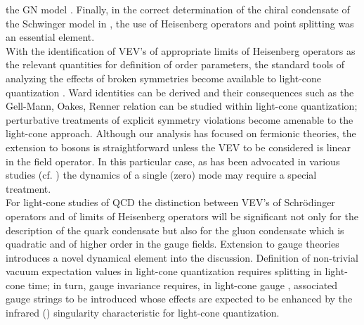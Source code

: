 \documentclass[a4paper,12pt]{article}
\begin{document}
the GN model \cite{Thies93}. Finally, in the correct determination of the chiral condensate
of the Schwinger model in \cite{Nakawaki00}, the use of Heisenberg operators and
point splitting was an essential element.
\\
With the identification of VEV's of appropriate limits of Heisenberg operators as the relevant
quantities for definition of order parameters, the standard tools of analyzing the effects of broken
symmetries become available to light-cone quantization \cite{LOTY00}. Ward identities can be
derived  and their consequences such as the  Gell-Mann, Oakes, Renner relation  \cite{GOR} can
be studied within light-cone quantization; perturbative treatments of explicit symmetry violations
become amenable to the light-cone approach. Although our analysis has focused on fermionic
theories, the extension to bosons is straightforward unless the VEV to be considered is linear
in the field operator. In this particular case, as has been advocated in various studies
(cf. \cite{Maskawa76,Harindranath87, Heinzl92,Bender93,Pinsky94}) the dynamics of a
single (zero) mode may require a special treatment. \\
For light-cone studies of QCD the distinction
between VEV's of Schr\"odinger operators and of limits of Heisenberg operators will be significant
not only for the description of the quark condensate but also for the gluon condensate which is
quadratic and of higher order in the gauge fields. Extension to gauge theories introduces a novel
dynamical element into the discussion.  Definition of non-trivial vacuum expectation values in
light-cone quantization requires splitting in light-cone time; in turn, gauge invariance requires, in
light-cone gauge \coordHE{}, associated gauge strings to be introduced whose effects are
expected to be enhanced by the infrared (\coordHE{}) singularity characteristic for light-cone
quantization.
\end{document}
